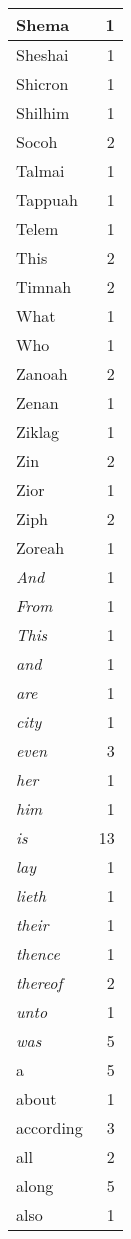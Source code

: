 \begin{center}
\begin{longtable}{l|r}
Shema & 1\\ \hline 
Sheshai & 1\\ \hline 
Shicron & 1\\ \hline 
Shilhim & 1\\ \hline 
Socoh & 2\\ \hline 
Talmai & 1\\ \hline 
Tappuah & 1\\ \hline 
Telem & 1\\ \hline 
This & 2\\ \hline 
Timnah & 2\\ \hline 
What & 1\\ \hline 
Who & 1\\ \hline 
Zanoah & 2\\ \hline 
Zenan & 1\\ \hline 
Ziklag & 1\\ \hline 
Zin & 2\\ \hline 
Zior & 1\\ \hline 
Ziph & 2\\ \hline 
Zoreah & 1\\ \hline 
\emph{And} & 1\\ \hline 
\emph{From} & 1\\ \hline 
\emph{This} & 1\\ \hline 
\emph{and} & 1\\ \hline 
\emph{are} & 1\\ \hline 
\emph{city} & 1\\ \hline 
\emph{even} & 3\\ \hline 
\emph{her} & 1\\ \hline 
\emph{him} & 1\\ \hline 
\emph{is} & 13\\ \hline 
\emph{lay} & 1\\ \hline 
\emph{lieth} & 1\\ \hline 
\emph{their} & 1\\ \hline 
\emph{thence} & 1\\ \hline 
\emph{thereof} & 2\\ \hline 
\emph{unto} & 1\\ \hline 
\emph{was} & 5\\ \hline 
a & 5\\ \hline 
about & 1\\ \hline 
according & 3\\ \hline 
all & 2\\ \hline 
along & 5\\ \hline 
also & 1\\ \hline 

\end{longtable}
\end{center}
